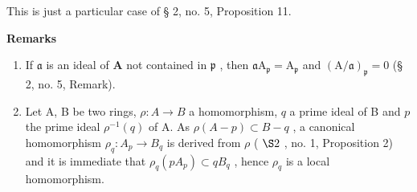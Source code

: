 This is just a particular case of § 2, no. 5, Proposition 11.

\textbf{Remarks}\par

\begin{enumerate}
\def\labelenumi{(\arabic{enumi})}
\setcounter{enumi}{2}
\item
  If \(\mathfrak{a}\) is an ideal of \(\mathbf{A}\) not contained in \(\mathfrak{p}\) , then \(\mathfrak{a}\mathrm{A}_{\mathfrak{p}} = \mathrm{A}_{\mathfrak{p}}\) and \((\mathrm{A} / \mathfrak{a})_{\mathfrak{p}} = 0\) (§ 2, no. 5, Remark).
\item
  Let A, B be two rings, \(\rho: A \to B\) a homomorphism, \(q\) a prime ideal of B and \(p\) the prime ideal \(\rho^{-1}(q)\) of A. As \(\rho(A - p) \subset B - q\) , a canonical homomorphism \(\rho_q: A_p \to B_q\) is derived from \(\rho\) ( \(\S 2\) , no. 1, Proposition 2) and it is immediate that \(\rho_q(pA_p) \subset qB_q\) , hence \(\rho_q\) is a local homomorphism.
\end{enumerate}
\relax{}
